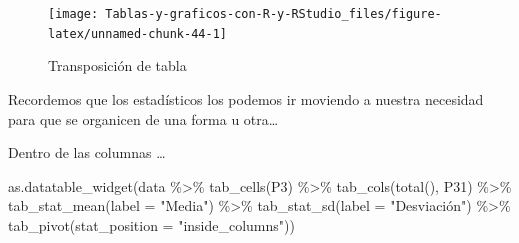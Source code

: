 \documentclass[
]{book}
\newenvironment{Shaded}{\begin{snugshade}}{\end{snugshade}}
\newcommand{\AttributeTok}[1]{\textcolor[rgb]{0.77,0.63,0.00}{#1}}
\newcommand{\FunctionTok}[1]{\textcolor[rgb]{0.00,0.00,0.00}{#1}}
\newcommand{\NormalTok}[1]{#1}
\newcommand{\OtherTok}[1]{\textcolor[rgb]{0.56,0.35,0.01}{#1}}
\newcommand{\SpecialCharTok}[1]{\textcolor[rgb]{0.00,0.00,0.00}{#1}}
\newcommand{\StringTok}[1]{\textcolor[rgb]{0.31,0.60,0.02}{#1}}
\begin{document}
\begin{Shaded}
\end{Shaded}

\begin{figure}[H]

{\centering \texttt{[image: Tablas-y-graficos-con-R-y-RStudio\_files/figure-latex/unnamed-chunk-44-1]} 

}

\caption{Transposición de tabla}\label{fig:unnamed-chunk-44}
\end{figure}

Recordemos que los estadísticos los podemos ir moviendo a nuestra necesidad para que se organicen de una forma u otra\ldots{}

Dentro de las columnas \ldots{}

\begin{Shaded}
\begin{Highlighting}[]
\FunctionTok{as.datatable\_widget}\NormalTok{(data }\SpecialCharTok{\%\textgreater{}\%}
  \FunctionTok{tab\_cells}\NormalTok{(P3) }\SpecialCharTok{\%\textgreater{}\%}
  \FunctionTok{tab\_cols}\NormalTok{(}\FunctionTok{total}\NormalTok{(), P31) }\SpecialCharTok{\%\textgreater{}\%}
  \FunctionTok{tab\_stat\_mean}\NormalTok{(}\AttributeTok{label =} \StringTok{"Media"}\NormalTok{) }\SpecialCharTok{\%\textgreater{}\%}
  \FunctionTok{tab\_stat\_sd}\NormalTok{(}\AttributeTok{label =} \StringTok{"Desviación"}\NormalTok{) }\SpecialCharTok{\%\textgreater{}\%}
  \FunctionTok{tab\_pivot}\NormalTok{(}\AttributeTok{stat\_position =} \StringTok{"inside\_columns"}\NormalTok{))}
\end{Highlighting}
\end{Shaded}
\end{document}
